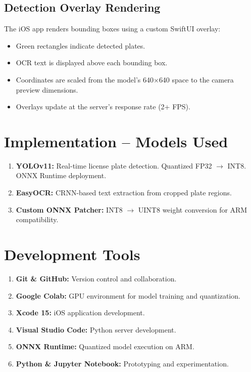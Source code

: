 \subsection{Detection Overlay Rendering}
The iOS app renders bounding boxes using a custom SwiftUI overlay:
\begin{itemize}
    \item Green rectangles indicate detected plates.
    \item OCR text is displayed above each bounding box.
    \item Coordinates are scaled from the model's 640$\times$640 space to the camera preview dimensions.
    \item Overlays update at the server's response rate (2+ FPS).
\end{itemize}

\section{Implementation -- Models Used}
\begin{enumerate}
    \item \textbf{YOLOv11:} Real-time license plate detection. Quantized FP32 $\to$ INT8. ONNX Runtime deployment.
    \item \textbf{EasyOCR:} CRNN-based text extraction from cropped plate regions.
    \item \textbf{Custom ONNX Patcher:} INT8 $\to$ UINT8 weight conversion for ARM compatibility.
\end{enumerate}

\section{Development Tools}
\begin{enumerate}
    \item \textbf{Git \& GitHub:} Version control and collaboration.
    \item \textbf{Google Colab:} GPU environment for model training and quantization.
    \item \textbf{Xcode 15:} iOS application development.
    \item \textbf{Visual Studio Code:} Python server development.
    \item \textbf{ONNX Runtime:} Quantized model execution on ARM.
    \item \textbf{Python \& Jupyter Notebook:} Prototyping and experimentation.
\end{enumerate}

